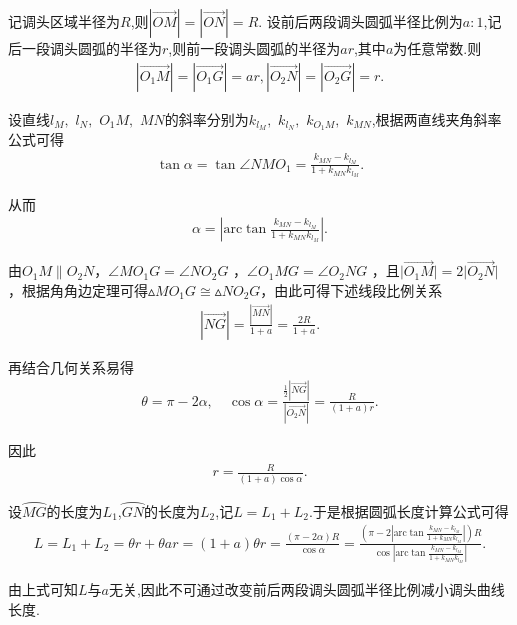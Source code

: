 \documentclass[../main.tex]{subfiles}
\begin{document}
\par 记调头区域半径为$R$,则$\left| \overrightarrow{OM} \right|=\left| \overrightarrow{ON} \right|=R$. 设前后两段调头圆弧半径比例为$a:1$,记后一段调头圆弧的半径为$r$,则前一段调头圆弧的半径为$ar$,其中$a$为任意常数.则
\begin{align}\label{1.........35}
\left| \overrightarrow{O_1M} \right|=\left| \overrightarrow{O_1G} \right|=ar,\left| \overrightarrow{O_2N} \right|=\left| \overrightarrow{O_2G} \right|=r.    
\end{align}
\par 设直线$l_M,$ $l_N,$ $O_1M,$ $MN$的斜率分别为$k_{l_M},$ $k_{l_N},$ $k_{O_1M},$ $k_{MN}$,根据两直线夹角斜率公式可得
\begin{align}\label{1.........36}
\tan \alpha =\tan \angle NMO_1=\frac{k_{MN}-k_{l_M}}{1+k_{MN}k_{l_M}}.
\end{align}
\par 从而
\begin{align}\label{1.........37}
\alpha =\left| \mathrm{arc}\tan \frac{k_{MN}-k_{l_M}}{1+k_{MN}k_{l_M}} \right|.
\end{align}
\par 由\(O_1M\parallel O_2N\)，\(\angle MO_1G=\angle NO_2G\) ，\(\angle O_1MG=\angle O_2NG\) ，且\(\vert\overrightarrow{O_1M}\vert = 2\vert\overrightarrow{O_2N}\vert\) ，根据角角边定理可得$\vartriangle MO_1G\cong \vartriangle NO_2G$，由此可得下述线段比例关系
\begin{align}\label{1.........38}
\left| \overrightarrow{NG} \right|=\frac{\left| \overrightarrow{MN} \right|}{1+a}=\frac{2R}{1+a}.
\end{align}
\par 再结合几何关系易得
\begin{align}\label{1.........39}
\theta =\pi -2\alpha ,\quad \cos \alpha =\frac{\frac{1}{2}\left| \overrightarrow{NG} \right|}{\left| \overrightarrow{O_2N} \right|}=\frac{R}{\left( 1+a \right) r}.
\end{align}
\par 因此
\begin{align}\label{1.........40}
r=\frac{R}{\left( 1+a \right) \cos \alpha}.
\end{align}
\par 设$\wideparen{MG}$的长度为$L_1$,$\wideparen{GN}$的长度为$L_2$,记$L=L_1+L_2$.于是根据圆弧长度计算公式可得
\begin{align}\label{equation-1}
L=L_1+L_2=\theta r+\theta ar=\left( 1+a \right) \theta r=\frac{\left( \pi -2\alpha \right) R}{\cos \alpha}=\frac{\left( \pi -2\left| \mathrm{arc}\tan \frac{k_{MN}-k_{l_M}}{1+k_{MN}k_{l_M}} \right| \right) R}{\cos \left| \mathrm{arc}\tan \frac{k_{MN}-k_{l_M}}{1+k_{MN}k_{l_M}} \right|}.
\end{align}
\par 由上式可知$L$与$a$无关,因此不可通过改变前后两段调头圆弧半径比例减小调头曲线长度.
\end{document}
